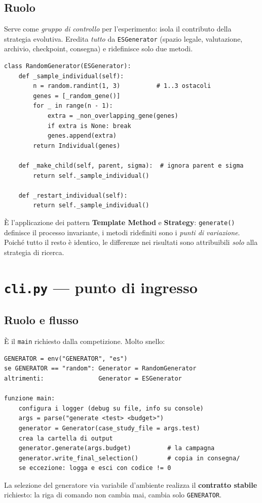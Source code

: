 \documentclass[11pt,a4paper]{report}
\newcommand{\code}[1]{\texttt{#1}}
\begin{document}
\subsection{Ruolo}
Serve come \emph{gruppo di controllo} per l'esperimento: isola il
contributo della strategia evolutiva. Eredita \emph{tutto} da
\code{ESGenerator} (spazio legale, valutazione, archivio, checkpoint,
consegna) e ridefinisce solo due metodi.
\begin{lstlisting}[style=py]
class RandomGenerator(ESGenerator):
    def _sample_individual(self):
        n = random.randint(1, 3)          # 1..3 ostacoli
        genes = [_random_gene()]
        for _ in range(n - 1):
            extra = _non_overlapping_gene(genes)
            if extra is None: break
            genes.append(extra)
        return Individual(genes)

    def _make_child(self, parent, sigma):  # ignora parent e sigma
        return self._sample_individual()

    def _restart_individual(self):
        return self._sample_individual()
\end{lstlisting}
È l'applicazione dei pattern \textbf{Template Method} e \textbf{Strategy}:
\code{generate()} definisce il processo invariante, i metodi ridefiniti
sono i \emph{punti di variazione}. Poiché tutto il resto è identico, le
differenze nei risultati sono attribuibili \emph{solo} alla strategia di
ricerca.

\section{\texttt{cli.py} --- punto di ingresso}
\label{sec:cli}

\subsection{Ruolo e flusso}
È il \code{main} richiesto dalla competizione. Molto snello:
\begin{lstlisting}[style=pseudo]
GENERATOR = env("GENERATOR", "es")
se GENERATOR == "random": Generator = RandomGenerator
altrimenti:               Generator = ESGenerator

funzione main:
    configura i logger (debug su file, info su console)
    args = parse("generate <test> <budget>")
    generator = Generator(case_study_file = args.test)
    crea la cartella di output
    generator.generate(args.budget)          # la campagna
    generator.write_final_selection()        # copia in consegna/
    se eccezione: logga e esci con codice != 0
\end{lstlisting}
La selezione del generatore via variabile d'ambiente realizza il
\textbf{contratto stabile} richiesto: la riga di comando non cambia mai,
cambia solo \code{GENERATOR}.
\end{document}
